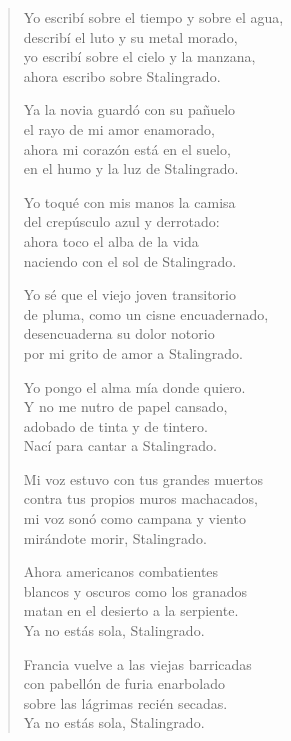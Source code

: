 \documentclass[12pt]{article}
\begin{document}
\clearpage
{}
\begin{verse}

Yo escribí sobre el tiempo y sobre el agua,\\
describí el luto y su metal morado,\\
yo escribí sobre el cielo y la manzana,\\
ahora escribo sobre Stalingrado.  

Ya la novia guardó con su pañuelo\\
el rayo de mi amor enamorado,\\
ahora mi corazón está en el suelo,\\
en el humo y la luz de Stalingrado.  

Yo toqué con mis manos la camisa\\
del crepúsculo azul y derrotado:\\
ahora toco el alba de la vida\\
naciendo con el sol de Stalingrado.  

Yo sé que el viejo joven transitorio\\
de pluma, como un cisne encuadernado,\\
desencuaderna su dolor notorio\\
por mi grito de amor a Stalingrado.  

Yo pongo el alma mía donde quiero.\\
Y no me nutro de papel cansado,\\
adobado de tinta y de tintero.\\
Nací para cantar a Stalingrado.  

Mi voz estuvo con tus grandes muertos\\
contra tus propios muros machacados,\\
mi voz sonó como campana y viento\\
mirándote morir, Stalingrado.  

Ahora americanos combatientes\\
blancos y oscuros como los granados\\
matan en el desierto a la serpiente.\\
Ya no estás sola, Stalingrado.  

Francia vuelve a las viejas barricadas\\
con pabellón de furia enarbolado\\
sobre las lágrimas recién secadas.\\
Ya no estás sola, Stalingrado.  


\end{verse}
\end{document}
